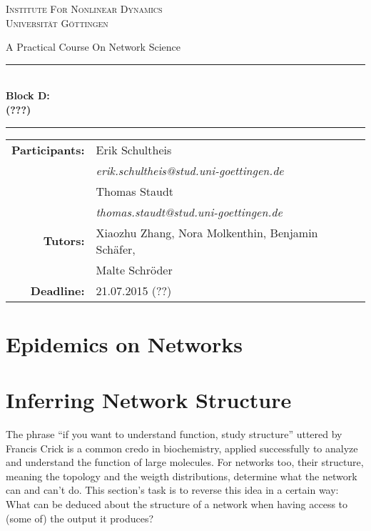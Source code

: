 \documentclass{scrartcl}
\begin{document}
\begin{titlepage}\centering
\textsc{\Large Institute For Nonlinear Dynamics \\[1.5ex] Universität Göttingen}

\vspace*{2cm}
{\huge A Practical Course On Network Science}
\vspace*{2cm}

\rule{\textwidth}{1pt}\\[0.5cm]
{\bfseries \huge Block D: \\[0.5cm] \huge \bfseries (???)\\[0.5cm]}
\rule{\textwidth}{1pt}

\vspace*{4cm}

\begin{Large}\begin{tabular}{rl}
        \textbf{Participants:}  & Erik Schultheis                                \\    
                   & \textit{erik.schultheis@stud.uni-goettingen.de}\\[0.5cm]
                   & Thomas Staudt                                  \\
                   & \textit{thomas.staudt@stud.uni-goettingen.de}  \\[1.0cm]

       \textbf{Tutors:}        & Xiaozhu Zhang, Nora Molkenthin, Benjamin Schäfer, \\
                               & Malte Schröder                                    \\[1.0cm]
       \textbf{Deadline:}      & 21.07.2015 (??)
\end{tabular}\end{Large}

\vspace*{1.5cm}


\end{titlepage}

\tableofcontents
\clearpage

\section{Epidemics on Networks}

\section{Inferring Network Structure}
The phrase \enquote{if you want to understand function, study structure}
uttered by Francis Crick is a common credo in biochemistry, applied
successfully to analyze and understand the function of large molecules. For
networks too, their structure, meaning the topology and the weigth
distributions, determine what the network can and can't do. This section's
task is to reverse this idea in a certain way: What can be deduced about
the structure of a network when having access to (some of) the output it
produces?
\end{document}
